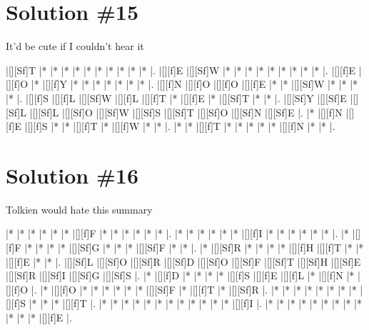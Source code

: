 \documentclass[letterpaper]{article}
\begin{document}
\section*{Solution \#15}
It'd be cute if I couldn't hear it

\vspace*{1em}
\begin{Puzzle}{11}{9}
|[][Sf]T  |*        |*        |*        |*        |*        |*        |*        |*        |*        |*        |.
|[][f]E   |[][Sf]W  |*        |*        |*        |*        |*        |*        |*        |*        |*        |.
|[][f]E   |[][f]O   |*        |[][f]Y   |*        |*        |*        |*        |*        |*        |*        |.
|[][f]N   |[][f]O   |[][f]O   |[][f]E   |*        |*        |[][Sf]W  |*        |*        |*        |*        |.
|[][f]S   |[][f]L   |[][Sf]W  |[][f]L   |[][f]T   |*        |[][f]E   |*        |[][Sf]T  |*        |*        |.
|[][Sf]Y  |[][Sf]E  |[][Sf]L  |[][Sf]L  |[][Sf]O  |[][Sf]W  |[][Sf]S  |[][Sf]T  |[][Sf]O  |[][Sf]N  |[][Sf]E  |.
|*        |[][f]N   |[][f]E   |[][f]S   |*        |*        |[][f]T   |*        |[][f]W   |*        |*        |.
|*        |*        |[][f]T   |*        |*        |*        |*        |*        |[][f]N   |*        |*        |.
\end{Puzzle}

\section*{Solution \#16}
Tolkien would hate this summary

\vspace*{1em}
\begin{Puzzle}{13}{10}
|*        |*        |*        |*        |*        |*        |[][f]F   |*        |*        |*        |*        |*        |*        |.
|*        |*        |*        |*        |*        |*        |[][f]I   |*        |*        |*        |*        |*        |*        |.
|*        |[][f]F   |*        |*        |*        |*        |[][Sf]G  |*        |*        |*        |[][Sf]F  |*        |*        |.
|*        |[][Sf]R  |*        |*        |*        |*        |[][f]H   |[][f]T   |*        |*        |[][f]E   |*        |*        |.
|[][Sf]L  |[][Sf]O  |[][Sf]R  |[][Sf]D  |[][Sf]O  |[][Sf]F  |[][Sf]T  |[][Sf]H  |[][Sf]E  |[][Sf]R  |[][Sf]I  |[][Sf]G  |[][Sf]S  |.
|*        |[][f]D   |*        |*        |*        |*        |[][f]S   |[][f]E   |[][f]L   |*        |[][f]N   |*        |[][f]O   |.
|*        |[][f]O   |*        |*        |*        |*        |*        |*        |[][Sf]F  |*        |[][f]T   |*        |[][Sf]R  |.
|*        |*        |*        |*        |*        |*        |*        |*        |[][f]S   |*        |*        |*        |[][f]T   |.
|*        |*        |*        |*        |*        |*        |*        |*        |*        |*        |*        |*        |[][f]I   |.
|*        |*        |*        |*        |*        |*        |*        |*        |*        |*        |*        |*        |[][f]E   |.
\end{Puzzle}
\end{document}
